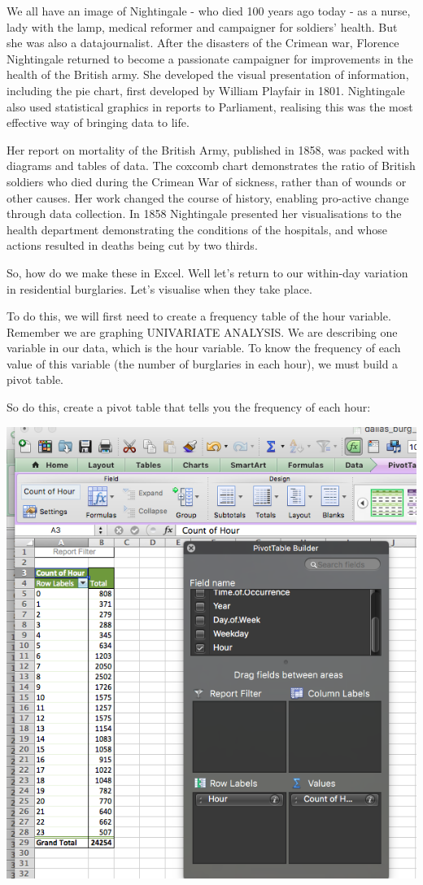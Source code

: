 \documentclass[]{book}
\theoremstyle{definition}
\theoremstyle{definition}
\theoremstyle{definition}
\theoremstyle{remark}
\begin{document}
We all have an image of Nightingale - who died 100 years ago today - as
a nurse, lady with the lamp, medical reformer and campaigner for
soldiers' health. But she was also a datajournalist. After the disasters
of the Crimean war, Florence Nightingale returned to become a passionate
campaigner for improvements in the health of the British army. She
developed the visual presentation of information, including the pie
chart, first developed by William Playfair in 1801. Nightingale also
used statistical graphics in reports to Parliament, realising this was
the most effective way of bringing data to life.

Her report on mortality of the British Army, published in 1858, was
packed with diagrams and tables of data. The coxcomb chart demonstrates
the ratio of British soldiers who died during the Crimean War of
sickness, rather than of wounds or other causes. Her work changed the
course of history, enabling pro-active change through data collection.
In 1858 Nightingale presented her visualisations to the health
department demonstrating the conditions of the hospitals, and whose
actions resulted in deaths being cut by two thirds.

 So, how do we make these in Excel. Well let's return to our within-day
variation in residential burglaries. Let's visualise when they take
place.

To do this, we will first need to create a frequency table of the hour
variable. Remember we are graphing UNIVARIATE ANALYSIS. We are
describing one variable in our data, which is the hour variable. To know
the frequency of each value of this variable (the number of burglaries
in each hour), we must build a pivot table.

So do this, create a pivot table that tells you the frequency of each
hour:

\includegraphics{imgs/hr_freq.png}
\end{document}
